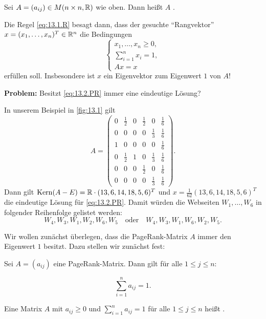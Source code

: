 \begin{definition}
	\label{def:13.2}
	Sei $A = (a_{ij}) \in M(n \times n, \mathbb{R})$ wie oben.
	Dann heißt $A$ .
\end{definition}

Die Regel \eqref{eq:13.1.R} besagt dann, dass der gesuchte \enquote{Rangvektor} $x = (x_1,\dots,x_n)^T \in \mathbb{R}^n$ die Bedingungen
\begin{equation}
	\begin{cases}
		x_1,\dots,x_n \geq 0, \\
		\sum_{i=1}^{n} x_i = 1, \\
		Ax = x
	\end{cases} \label{eq:13.2.PR}
\end{equation}
erfüllen soll.
Insbesondere ist $x$ ein Eigenvektor zum Eigenwert $1$ von $A$!

\textbf{Problem:} Besitzt \eqref{eq:13.2.PR} immer eine eindeutige Lösung?

\begin{beispiel}
	\label{bsp:13.3}
	In unserem Beispiel in \autoref{fig:13.1} gilt
	\[
		A = \begin{pmatrix}
			0 & \frac{1}{2} & 0 & \frac{1}{2} & 0           & \frac{1}{6} \\
			0 & 0           & 0 & 0           & \frac{1}{3} & \frac{1}{6} \\
			1 & 0           & 0 & 0           & 0           & \frac{1}{6} \\
			0 & \frac{1}{2} & 1 & 0           & \frac{1}{3} & \frac{1}{6} \\
			0 & 0           & 0 & \frac{1}{2} & 0           & \frac{1}{6} \\
			0 & 0           & 0 & 0           & \frac{1}{3} & \frac{1}{6}
		\end{pmatrix}. 
	\]
	Dann gilt $\operatorname{Kern}(A - E) = \mathbb{R} \cdot (13,6,14,18,5,6)^T$ und $x = \frac{1}{62} (13,6,14,18,5,6)^T$ die eindeutige Lösung für \eqref{eq:13.2.PR}.
	Damit würden die Webseiten $W_1,\dots,W_6$ in folgender Reihenfolge gelistet werden:
	\[
		W_4, W_3, W_1, W_2, W_6, W_5 \quad \text{oder} \quad W_4, W_3, W_1, W_6, W_2, W_5.
	\]
\end{beispiel}

Wir wollen zunächst überlegen, dass die PageRank-Matrix $A$ immer den Eigenwert $1$ besitzt.
Dazu stellen wir zunächst fest:
	
\begin{lemma}
	\label{lemma:13.4}
	Sei $A = (a_{ij})$ eine PageRank-Matrix.
	Dann gilt für alle $1 \leq j \leq n$:
	
	\[
		\sum_{i=1}^n a_{ij} = 1.
	\]
	
	Eine Matrix $A$ mit $a_{ij} \geq 0$ und $\sum_{i=1}^{n} a_{ij} = 1$ für alle $1 \leq j \leq n$ heißt .
\end{lemma}

